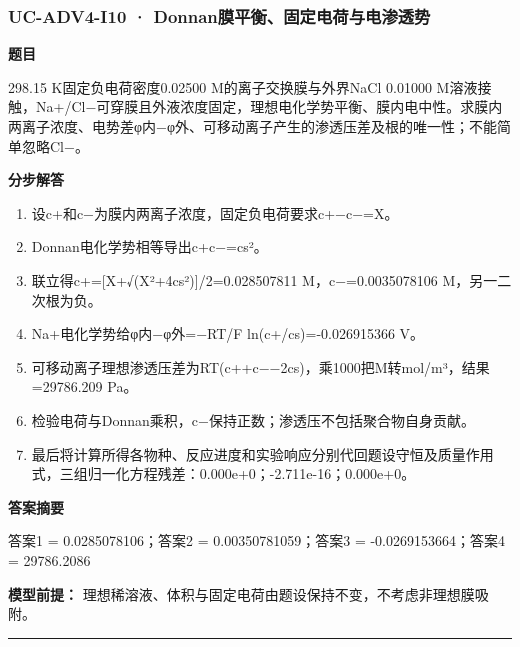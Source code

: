 \documentclass[UTF8,11pt,a4paper]{ctexart}
\begin{document}
\subsubsection*{UC-ADV4-I10 · Donnan膜平衡、固定电荷与电渗透势}
\noindent\textbf{题目}\par
298.15 K固定负电荷密度0.02500 M的离子交换膜与外界NaCl 0.01000 M溶液接触，Na+/Cl−可穿膜且外液浓度固定，理想电化学势平衡、膜内电中性。求膜内两离子浓度、电势差φ内−φ外、可移动离子产生的渗透压差及根的唯一性；不能简单忽略Cl−。\par
\medskip\noindent\textbf{分步解答}
\begin{enumerate}
\item 设c+和c−为膜内两离子浓度，固定负电荷要求c+−c−=X。
\item Donnan电化学势相等导出c+c−=cs²。
\item 联立得c+=[X+√(X²+4cs²)]/2=0.028507811 M，c−=0.0035078106 M，另一二次根为负。
\item Na+电化学势给φ内−φ外=−RT/F ln(c+/cs)=-0.026915366 V。
\item 可移动离子理想渗透压差为RT(c++c−−2cs)，乘1000把M转mol/m³，结果=29786.209 Pa。
\item 检验电荷与Donnan乘积，c−保持正数；渗透压不包括聚合物自身贡献。
\item 最后将计算所得各物种、反应进度和实验响应分别代回题设守恒及质量作用式，三组归一化方程残差：0.000e+0；-2.711e-16；0.000e+0。
\end{enumerate}
\noindent\textbf{答案摘要}\par
答案1 = 0.0285078106；答案2 = 0.00350781059；答案3 = -0.0269153664；答案4 = 29786.2086\par
\noindent\textbf{模型前提：}
理想稀溶液、体积与固定电荷由题设保持不变，不考虑非理想膜吸附。\par
\medskip\hrule\medskip
{}
\end{document}
